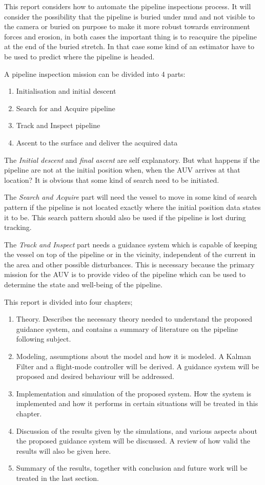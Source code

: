 	This report considers how to automate the pipeline inspections process. It will consider the
	possibility that the pipeline is buried under mud and not visible to the camera or buried on purpose
	to make it more robust towards environment forces and erosion, in both cases the important thing 
	is to reacquire the pipeline at the end of the buried stretch. In that case some kind of an
	estimator have to be used to predict where the pipeline is headed.
	
	A pipeline inspection mission can be divided into 4 parts:
	\begin{enumerate}
	 \item Initialisation and initial descent
	 \item Search for and Acquire pipeline
	 \item Track and Inspect pipeline
	 \item Ascent to the surface and deliver the acquired data
	\end{enumerate}

	The \textit{Initial descent} and \textit{final ascent} are self explanatory. But what happens if the
	pipeline are not at the initial position when, when the AUV arrives at that location? It is obvious
	that some kind of search need to be initiated. 
	
	The \textit{Search and Acquire} part will need the vessel to move in some kind of search pattern if
	the pipeline is not located exactly where the initial position data states it to be. This search
	pattern should also be used if the pipeline is lost during tracking. 
	
	The \textit{Track and Inspect} part needs a guidance system which is capable of keeping the vessel 
	on top of the pipeline or in the vicinity, independent of the current in the area and other possible 
	disturbances. This is
	necessary because the primary mission for the AUV is to provide video of the pipeline which can be
	used to determine the state and well-being of the pipeline.
	
	This report is divided into four chapters;
	\begin{enumerate}
	 \item Theory. Describes the necessary theory needed to understand the proposed guidance system, and
	contains a summary of literature on the pipeline following subject.
	 \item Modeling, assumptions about the model and how it is modeled. A Kalman Filter and a flight-mode
	 controller will be derived. A guidance system will be proposed and desired behaviour will be
	 addressed.
	 \item Implementation and simulation of the proposed system. How the system is implemented and how it
	 performs in certain situations will be treated in this chapter. 
	 \item Discussion of the results given by the simulations, and various aspects about the proposed
	 guidance system will be discussed. A review of how valid the results will also be given here.
	 \item Summary of the results, together with conclusion and future work will be treated in the last
	section.
	\end{enumerate}

	
	
	

